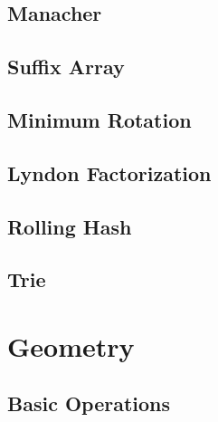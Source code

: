 \documentclass[a4paper,10pt,twocolumn,oneside,x11names]{article}
\begin{document}
\subsection{Manacher}


\subsection{Suffix Array}


%

\subsection{Minimum Rotation}


\subsection{Lyndon Factorization}


\subsection{Rolling Hash}


\subsection{Trie}


% 

\section{Geometry}

\subsection{Basic Operations}

\end{document}
